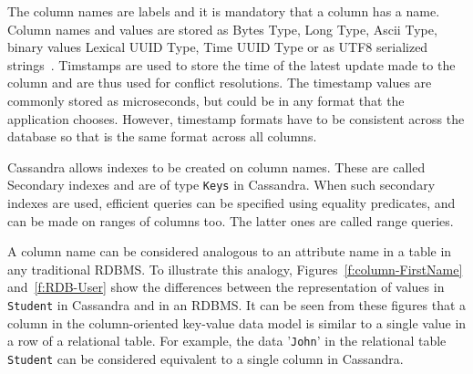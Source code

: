 The column names are labels  and it is mandatory that a column has a name. 
Column names and values are stored as Bytes Type,   Long Type, Ascii Type,  
binary values Lexical UUID Type,   Time UUID Type or as UTF8 serialized
strings~\citep{datastaxDataModel,BOOK}.  Timstamps are used to store the time
of the latest update made to the column and are thus used for conflict resolutions.  The timestamp values are commonly stored as microseconds,   but could be in any format that the
application chooses.  However,   timestamp formats have to be consistent across
the database so that is the same format across all columns.

Cassandra allows indexes to be created on column names.  These are called
Secondary indexes and are of type \texttt{Keys} in Cassandra.  When such
secondary indexes are used,   efficient queries can be specified using equality
predicates,   and can be made on ranges of columns too.  The latter ones are
called range queries.

A column name can be considered analogous to an attribute name in a table in any
traditional \ac{RDBMS}.  To illustrate this analogy,
Figures~\ref{f:column-FirstName} and~\ref{f:RDB-User} show the differences
between the representation of values in \texttt{Student} in Cassandra and in an
\ac{RDBMS}.
It can be seen from these figures that a column in the column-oriented key-value
data model is similar to a single value in a row of a relational table.  For
example,   the data '\texttt{John}' in the relational table \texttt{Student} can
be considered equivalent to a single column in Cassandra.

